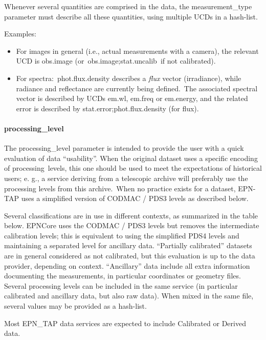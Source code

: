 \documentclass[11pt,a4paper]{ivoa}
\begin{document}
Whenever several quantities are comprised in the data, the measurement\_type parameter must describe all these quantities, using multiple UCDs in a hash-list. 

Examples:

\begin{itemize}
\item For images in general (i.e., actual measurements with a camera), the relevant UCD is obs.image (or obs.image;stat.uncalib if not calibrated).
\item For spectra: phot.flux.density describes a \emph{flux} vector (irradiance), while radiance and reflectance are currently being defined. The associated spectral vector is described by UCDs em.wl, em.freq or em.energy, and the related error is described by stat.error;phot.flux.density (for flux).
\end{itemize}

\paragraph{processing\_level}

The processing\_level parameter is intended to provide the user with a quick evaluation of data ``usability''. When the original dataset uses a specific encoding of processing levels, this one should be used to meet the expectations of historical users; e. g., a service deriving from a telescopic archive will preferably use the processing levels from this archive. When no practice exists for a dataset, EPN-TAP uses a simplified version of CODMAC / PDS3 levels as described below.

Several classifications are in use in different contexts, as summarized in the table below.  EPNCore uses the CODMAC / PDS3 levels but removes the intermediate calibration levels; this is equivalent to using the simplified PDS4 levels and maintaining a separated level for ancillary data. ``Partially calibrated'' datasets are in general considered as not calibrated, but this evaluation is up to the data provider, depending on context. ``Ancillary'' data include all extra information documenting the measurements, in particular coordinates or geometry files. Several processing levels can be included in the same service (in particular calibrated and ancillary data, but also raw data). When mixed in the same file, several values may be provided as a hash-list.

Most EPN\_TAP data services are expected to include Calibrated or Derived data. 
\end{document}
